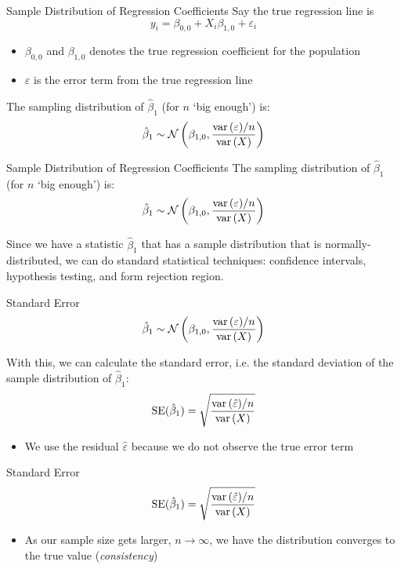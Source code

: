 \documentclass[aspectratio=169,t,11pt,table]{beamer}
\begin{document}
\begin{frame}{Sample Distribution of Regression Coefficients}
  Say the true regression line is 
  $$
      y_i = \beta_{0,0} + X_i \beta_{1,0} + \varepsilon_i
  $$
  \begin{itemize}
    \item $\beta_{0,0}$ and $\beta_{1,0}$ denotes the true regression coefficient for the population
    
    \item $\varepsilon$ is the error term from the true regression line 
  \end{itemize}

  \pause
  \bigskip
  The sampling distribution of $\hat{\beta}_1$ (for $n$ `big enough') is:
  $$
    \hat{\beta}_1 \sim 
    \mathcal{N}\left( 
      \beta_{1, 0}, \frac{ \var{\varepsilon} / n }{\var{X}} 
    \right)
  $$
\end{frame}

\begin{frame}{Sample Distribution of Regression Coefficients}
  The sampling distribution of $\hat{\beta}_1$ (for $n$ `big enough') is:
  $$
    \hat{\beta}_1 \sim 
    \mathcal{N}\left( 
      \beta_{1, 0}, \frac{ \var{\varepsilon} / n }{\var{X}} 
    \right)
  $$

  \bigskip
  Since we have a statistic $\hat{\beta}_1$ that has a sample distribution that is normally-distributed, we can do standard statistical techniques: confidence intervals, hypothesis testing, and form rejection region.  
\end{frame}

\begin{frame}{Standard Error}
  $$
    \hat{\beta}_1 \sim 
    \mathcal{N}\left( 
      \beta_{1, 0}, \frac{ \var{\varepsilon} / n }{\var{X}} 
    \right)
  $$

  \bigskip
  With this, we can calculate the \alert{standard error}, i.e. the standard deviation of the sample distribution of $\hat{\beta}_1$:
  $$
    \text{SE}(\hat{\beta}_1) = \sqrt{ \frac{ \var{\hat{\varepsilon}} / n }{\var{X}} }
  $$
  \begin{itemize}
    \item We use the residual $\hat{\varepsilon}$ because we do not observe the true error term
  \end{itemize}
\end{frame}

\begin{frame}{Standard Error}
  $$
    \text{SE}(\hat{\beta}_1) = \sqrt{ \frac{ \var{\hat{\varepsilon}} / n }{\var{X}} }
  $$

  \begin{itemize}
    \item As our sample size gets larger, $n \to \infty$, we have the distribution converges to the true value (\emph{consistency})
  \end{itemize}
\end{frame}
\end{document}
